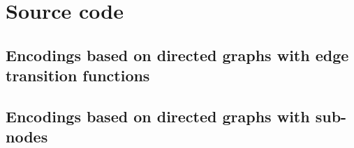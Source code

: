 
\section{Source code}
\label{sec:source}

\subsection{Encodings based on directed graphs with edge transition functions}
%



\newpage

\subsection{Encodings based on directed graphs with sub-nodes}





% 
% 

